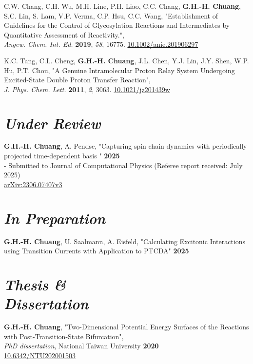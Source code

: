 C.W. Chang, C.H. Wu, M.H. Line, P.H. Liao, C.C. Chang, \textbf{G.H.-H. Chuang}, S.C. Lin, S. Lam, V.P. Verma, C.P. Hsu, C.C. Wang, "Establishment of Guidelines for the Control of Glycosylation Reactions and Intermediates by Quantitative Assessment of Reactivity.", \\
\textit{Angew. Chem. Int. Ed.} \textbf{2019}, \textit{58}, 16775.
\hfill
\href{https://onlinelibrary.wiley.com/doi/full/10.1002/anie.201906297}{10.1002/anie.201906297}

K.C. Tang, C.L. Cheng, \textbf{G.H.-H. Chuang}, J.L. Chen, Y.J. Lin, J.Y. Shen, W.P. Hu, P.T. Chou, "A Genuine Intramolecular Proton Relay System Undergoing Excited-State Double Proton Transfer Reaction", \\
\textit{J. Phys. Chem. Lett.} \textbf{2011}, \textit{2}, 3063.
\hfill
\href{https://pubs.acs.org/doi/abs/10.1021/jz201439w}{10.1021/jz201439w}





\section{\sl Under Review}
\textbf{G.H.-H. Chuang}, A. Pendse, "Capturing spin chain dynamics with periodically projected time-dependent basis " \hfill  \textbf{2025} \\
- Submitted to Journal of Computational Physics (Referee report received: July 2025) \\
\null \hfill \href{https://arxiv.org/abs/2306.07407}{arXiv:2306.07407v3}


\section{\sl In Preparation}


\textbf{G.H.-H. Chuang}, U. Saalmann, A. Eisfeld, "Calculating Excitonic Interactions using Transition Currents with Application to PTCDA" \hfill \textbf{2025}


\section{\sl Thesis \& \\Dissertation}
\textbf{G.H.-H. Chuang}, "Two-Dimensional Potential Energy Surfaces of the Reactions with Post-Transition-State Bifurcation", \\
\textit{PhD dissertation}, National Taiwan University \hfill \textbf{2020} \\
\null \hfill \href{https://www.airitilibrary.com/Publication/alDetailedMesh?DocID=U0001-1407202012345300}{10.6342/NTU202001503}

